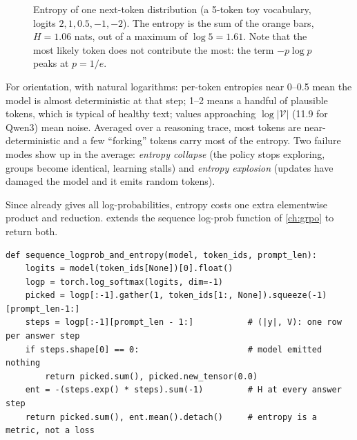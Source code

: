 \begin{figure}[ht]
\centering
{}
\caption{Entropy of one next-token distribution (a 5-token toy vocabulary, logits
$2,1,0.5,-1,-2$). The entropy is the sum of the orange bars, $H=1.06$ nats, out of a maximum
of $\log5=1.61$. Note that the most likely token does not contribute the most: the term
$-p\log p$ peaks at $p=1/e$.}
\label{fig:grpo2:entropybar}
\end{figure}

For orientation, with natural logarithms: per-token entropies near 0--0.5 mean the model is
almost deterministic at that step; 1--2 means a handful of plausible tokens, which is typical
of healthy text; values approaching $\log|\mathcal V|$ (11.9 for Qwen3) mean noise. Averaged
over a reasoning trace, most tokens are near-deterministic and a few ``forking'' tokens carry
most of the entropy. Two failure modes show up in the average:
\emph{entropy collapse} (the policy stops exploring, groups become identical, learning stalls)
and \emph{entropy explosion} (updates have damaged the model and it emits random tokens).

Since  already gives all log-probabilities, entropy costs one extra
elementwise product and reduction.  extends the sequence log-prob
function of \cref{ch:grpo} to return both.

\begin{lstlisting}[caption={Sequence log-probability and mean per-step entropy in one pass.},label={lst:grpo2:entropy}]
def sequence_logprob_and_entropy(model, token_ids, prompt_len):
    logits = model(token_ids[None])[0].float()
    logp = torch.log_softmax(logits, dim=-1)
    picked = logp[:-1].gather(1, token_ids[1:, None]).squeeze(-1)[prompt_len-1:]
    steps = logp[:-1][prompt_len - 1:]           # (|y|, V): one row per answer step
    if steps.shape[0] == 0:                      # model emitted nothing
        return picked.sum(), picked.new_tensor(0.0)
    ent = -(steps.exp() * steps).sum(-1)         # H at every answer step
    return picked.sum(), ent.mean().detach()     # entropy is a metric, not a loss
\end{lstlisting}

